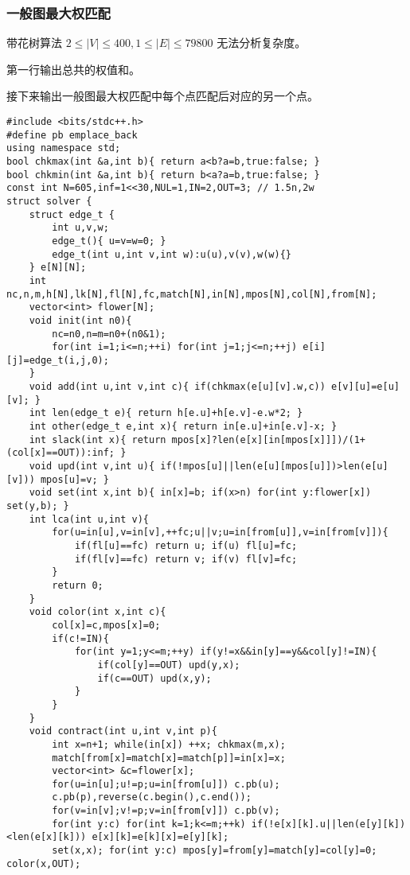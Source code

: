 \documentclass[UTF8]{ctexart}
\begin{document}
\subsubsection{一般图最大权匹配}
带花树算法 $2 \leq|V| \leq 400, 1 \leq |E| \leq 79800$ 无法分析复杂度。

第一行输出总共的权值和。

接下来输出一般图最大权匹配中每个点匹配后对应的另一个点。

\begin{framed}
\begin{lstlisting}
#include <bits/stdc++.h>
#define pb emplace_back
using namespace std;
bool chkmax(int &a,int b){ return a<b?a=b,true:false; }
bool chkmin(int &a,int b){ return b<a?a=b,true:false; }
const int N=605,inf=1<<30,NUL=1,IN=2,OUT=3; // 1.5n,2w
struct solver {
    struct edge_t {
        int u,v,w;
        edge_t(){ u=v=w=0; }
        edge_t(int u,int v,int w):u(u),v(v),w(w){}
    } e[N][N];
    int nc,n,m,h[N],lk[N],fl[N],fc,match[N],in[N],mpos[N],col[N],from[N];
    vector<int> flower[N];
    void init(int n0){
        nc=n0,n=m=n0+(n0&1);
        for(int i=1;i<=n;++i) for(int j=1;j<=n;++j) e[i][j]=edge_t(i,j,0);
    }
    void add(int u,int v,int c){ if(chkmax(e[u][v].w,c)) e[v][u]=e[u][v]; }
    int len(edge_t e){ return h[e.u]+h[e.v]-e.w*2; }
    int other(edge_t e,int x){ return in[e.u]+in[e.v]-x; }
    int slack(int x){ return mpos[x]?len(e[x][in[mpos[x]]])/(1+(col[x]==OUT)):inf; }
    void upd(int v,int u){ if(!mpos[u]||len(e[u][mpos[u]])>len(e[u][v])) mpos[u]=v; }
    void set(int x,int b){ in[x]=b; if(x>n) for(int y:flower[x]) set(y,b); }
    int lca(int u,int v){
        for(u=in[u],v=in[v],++fc;u||v;u=in[from[u]],v=in[from[v]]){
            if(fl[u]==fc) return u; if(u) fl[u]=fc;
            if(fl[v]==fc) return v; if(v) fl[v]=fc;
        }
        return 0;
    }
    void color(int x,int c){
        col[x]=c,mpos[x]=0;
        if(c!=IN){
            for(int y=1;y<=m;++y) if(y!=x&&in[y]==y&&col[y]!=IN){
                if(col[y]==OUT) upd(y,x);
                if(c==OUT) upd(x,y);
            }
        }
    }
    void contract(int u,int v,int p){
        int x=n+1; while(in[x]) ++x; chkmax(m,x);
        match[from[x]=match[x]=match[p]]=in[x]=x;
        vector<int> &c=flower[x];
        for(u=in[u];u!=p;u=in[from[u]]) c.pb(u);
        c.pb(p),reverse(c.begin(),c.end());
        for(v=in[v];v!=p;v=in[from[v]]) c.pb(v);
        for(int y:c) for(int k=1;k<=m;++k) if(!e[x][k].u||len(e[y][k])<len(e[x][k])) e[x][k]=e[k][x]=e[y][k];
        set(x,x); for(int y:c) mpos[y]=from[y]=match[y]=col[y]=0; color(x,OUT);

\end{lstlisting}
\end{framed}
\end{document}
